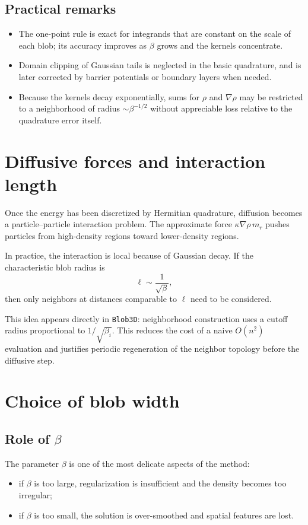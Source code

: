 \documentclass[11pt,a4paper]{article}
\begin{document}
\subsection{Practical remarks}
\begin{itemize}[leftmargin=*]
  \item The one-point rule is exact for integrands that are constant on the scale of each blob; its accuracy improves as $\beta$ grows and the kernels concentrate.
  \item Domain clipping of Gaussian tails is neglected in the basic quadrature, and is later corrected by barrier potentials or boundary layers when needed.
  \item Because the kernels decay exponentially, sums for $\rho$ and $\nabla\rho$ may be restricted to a neighborhood of radius $\sim\beta^{-1/2}$ without appreciable loss relative to the quadrature error itself.
\end{itemize}

\section{Diffusive forces and interaction length}
Once the energy has been discretized by Hermitian quadrature, diffusion becomes a particle--particle interaction problem. The approximate force $\kappa\nabla\rho\,m_r$ pushes particles from high-density regions toward lower-density regions.

In practice, the interaction is local because of Gaussian decay. If the characteristic blob radius is
\begin{equation}
\ell \sim \frac{1}{\sqrt{\beta}},
\end{equation}
then only neighbors at distances comparable to $\ell$ need to be considered.

This idea appears directly in \texttt{Blob3D}: neighborhood construction uses a cutoff radius proportional to $1/\sqrt{\beta_i}$. This reduces the cost of a naive $O(n^2)$ evaluation and justifies periodic regeneration of the neighbor topology before the diffusive step.

\section{Choice of blob width}
\subsection{Role of $\beta$}
The parameter $\beta$ is one of the most delicate aspects of the method:
\begin{itemize}[leftmargin=*]
  \item if $\beta$ is too large, regularization is insufficient and the density becomes too irregular;
  \item if $\beta$ is too small, the solution is over-smoothed and spatial features are lost.
\end{itemize}
\end{document}
